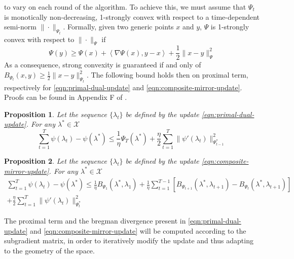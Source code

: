 \documentclass[notitlepage]{article}
\newtheorem{proposition}{Proposition}[section]
\begin{document}
to vary on each round of the algorithm. To achieve this, we must assume that $\Psi_t$ is monotically non-decreasing, 1-strongly convex with respect to a time-dependent semi-norm $\|\cdot\|_{\Psi_t}$. Formally, given two generic points $x$ and $y$, $\Psi$ is 1-strongly convex with respect 
to $\|\cdot\|_\Psi$ if
\[ \Psi(y) \ge \Psi(x) + \left\langle \nabla \Psi(x),y-x \right\rangle + \frac{1}{2} \|x-y\|_\Psi^2 \]
As a consequence, strong convexity is guaranteed if and only of $B_{\Psi_t}(x,y) \ge \frac{1}{2} \|x-y\|_{\Psi_t}^2$. The following bound holds then on proximal term, respectively for \eqref{eqn:primal-dual-update} and \eqref{eqn:composite-mirror-update}. 
Proofs can be found in Appendix F of \cite{JMLR:v12:duchi11a}.
\begin{proposition}
  Let the sequence $\{\lambda_t\}$ be defined by the update \eqref{eqn:primal-dual-update}. For any $\lambda^* \in \mathcal{X}$
  \begin{equation}
    \sum_{t=1}^T \psi(\lambda_t) - \psi(\lambda^*) \le \frac{1}{\eta} \Psi_T(\lambda^*) + \frac{\eta}{2} \sum_{t=1}^T \| \psi'(\lambda_t) \|_{\Psi_{t-1}^*}^2
  \end{equation}
\end{proposition}
\begin{proposition}
  Let the sequence $\{\lambda_t\}$ be defined by the update \eqref{eqn:composite-mirror-update}. For any $\lambda^* \in \mathcal{X}$
  \begin{align*}
    \sum_{t=1}^T \psi(\lambda_t) - \psi(\lambda^*) \le \frac{1}{\eta} B_{\Psi_1} (\lambda^*,\lambda_1) + \frac{1}{\eta} \sum_{t=1}^{T-1} \left[ B_{\Psi_{t+1}}(\lambda^*,\lambda_{t+1}) - B_{\Psi_t}(\lambda^*,\lambda_{t+1}) \right] \\ + \frac{\eta}{2} \sum_{t=1}^T \| \psi'(\lambda_t) \|_{\Psi_t^*}^2
  \end{align*}
\end{proposition}
The proximal term and the bregman divergence present in \eqref{eqn:primal-dual-update} and \eqref{eqn:composite-mirror-update} will be computed according to the subgradient matrix, in order to iteratively modify the update and thus adapting to the 
geometry of the space.
\end{document}
